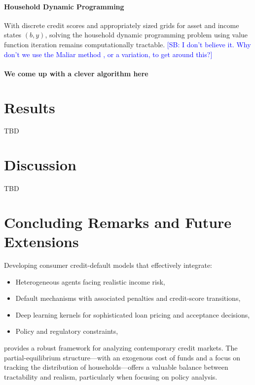 \documentclass[acmsmall]{acmart}
\newcommand{\spb}[1]{\textcolor{blue}{[SB: #1]}}
\begin{document}
\paragraph{Household Dynamic Programming}
With discrete credit scores and appropriately sized grids for asset and income states $(b,y)$, solving the household dynamic programming problem using value function iteration remains computationally tractable.
\spb{I don't believe it. Why don't we use the Maliar method \cite{maliar2021deep}, or a variation, to get around this?}

\paragraph{We come up with a clever algorithm here}

\section{Results}

TBD

\section{Discussion}

TBD




\section{Concluding Remarks and Future Extensions}

Developing consumer credit-default models that effectively integrate:
\begin{itemize}
    \item Heterogeneous agents facing realistic income risk,
    \item Default mechanisms with associated penalties and credit-score transitions,
    \item Deep learning kernels for sophisticated loan pricing and acceptance decisions,
    \item Policy and regulatory constraints,
\end{itemize}
provides a robust framework for analyzing contemporary credit markets. The partial-equilibrium structure—with an exogenous cost of funds and a focus on tracking the distribution of households—offers a valuable balance between tractability and realism, particularly when focusing on policy analysis. 
\end{document}
